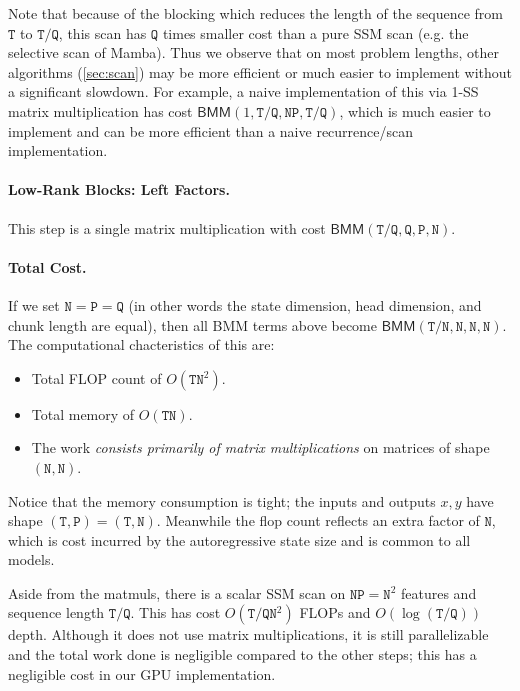 \documentclass{article}
\begin{document}
Note that because of the blocking which reduces the length of the sequence from $\mathtt{T}$ to $\mathtt{T}/\mathtt{Q}$,
this scan has $\mathtt{Q}$ times smaller cost than a pure SSM scan (e.g. the selective scan of Mamba).
Thus we observe that on most problem lengths,
other algorithms (\cref{sec:scan}) may be more efficient or much easier to implement without a significant slowdown.
For example, a naive implementation of this via 1-SS matrix multiplication has cost $\mathsf{BMM}(1, \mathtt{T}/\mathtt{Q}, \mathtt{NP}, \mathtt{T}/\mathtt{Q})$,
which is much easier to implement and can be more efficient than a naive recurrence/scan implementation.

\paragraph{Low-Rank Blocks: Left Factors.}
This step is a single matrix multiplication with cost $\mathsf{BMM}(\mathtt{T}/\mathtt{Q}, \mathtt{Q}, \mathtt{P}, \mathtt{N})$.

\paragraph{Total Cost.}
If we set $\mathtt{N} = \mathtt{P} = \mathtt{Q}$ (in other words the state dimension, head dimension, and chunk length are equal),
then all BMM terms above become $\mathsf{BMM}(\mathtt{T}/\mathtt{N}, \mathtt{N}, \mathtt{N}, \mathtt{N})$.
The computational chacteristics of this are:
\begin{itemize}
  \item Total FLOP count of $O(\mathtt{TN}^2)$.
  \item Total memory of $O(\mathtt{TN})$.
  \item The work \emph{consists primarily of matrix multiplications} on matrices of shape $(\mathtt{N}, \mathtt{N})$.
\end{itemize}
Notice that the memory consumption is tight; the inputs and outputs $x, y$ have shape $(\mathtt{T}, \mathtt{P}) = (\mathtt{T}, \mathtt{N})$.
Meanwhile the flop count reflects an extra factor of $\mathtt{N}$, which is cost incurred by the autoregressive state size and is common to all models.

Aside from the matmuls, there is a scalar SSM scan on $\mathtt{NP} = \mathtt{N}^2$ features and sequence length $\mathtt{T}/\mathtt{Q}$.
This has cost $O(\mathtt{T}/\mathtt{Q} \mathtt{N}^2)$ FLOPs and $O(\log(\mathtt{T}/\mathtt{Q}))$ depth.
Although it does not use matrix multiplications, it is still parallelizable and the total work done is negligible compared to the other steps;
this has a negligible cost in our GPU implementation.
\end{document}
